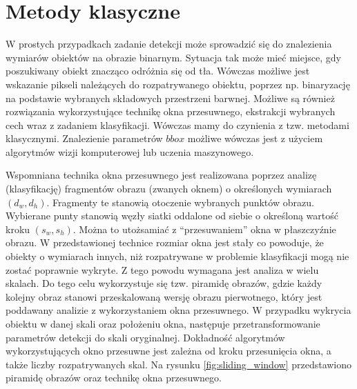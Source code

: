 \section{Metody klasyczne}

W prostych przypadkach zadanie detekcji może sprowadzić się do znalezienia wymiarów obiektów na obrazie binarnym.
Sytuacja tak może mieć miejsce, gdy poszukiwany obiekt znacząco odróżnia się od tła.
Wówczas możliwe jest wskazanie pikseli należących do rozpatrywanego obiektu, poprzez np. binaryzację na podstawie wybranych składowych przestrzeni barwnej.
Możliwe są również rozwiązania wykorzystujące technikę okna przesuwnego, ekstrakcji wybranych cech wraz z zadaniem klasyfikacji.
Wówczas mamy do czynienia z tzw. metodami klasycznymi.
Znalezienie parametrów $bbox$ możliwe wówczas jest z użyciem algorytmów wizji komputerowej lub uczenia maszynowego.

Wspomniana technika okna przesuwnego jest realizowana poprzez analizę (klasyfikację) fragmentów obrazu (zwanych oknem) o określonych wymiarach $(d_w,d_h)$. 
Fragmenty te stanowią otoczenie wybranych punktów obrazu.
Wybierane punty stanowią węzły siatki oddalone od siebie o określoną wartość kroku $(s_w,s_h)$. 
Można to utożsamiać z ``przesuwaniem'' okna w płaszczyźnie obrazu.
W przedstawionej technice rozmiar okna jest stały co powoduje, że obiekty o wymiarach innych, niż 
rozpatrywane w problemie klasyfikacji mogą nie zostać poprawnie wykryte.
Z tego powodu wymagana jest analiza w wielu skalach.
Do tego celu wykorzystuje się tzw. piramidę obrazów, gdzie każdy kolejny obraz stanowi przeskalowaną wersję obrazu pierwotnego, który jest  poddawany analizie z wykorzystaniem okna przesuwnego.
W przypadku wykrycia obiektu w danej skali oraz położeniu okna, następuje przetransformowanie parametrów detekcji do skali oryginalnej.
Dokładność algorytmów wykorzystujących okno przesuwne jest zależna od kroku przesunięcia okna, a także liczby rozpatrywanych skal.
Na rysunku \ref{fig:sliding_window} przedstawiono  piramidę obrazów oraz technikę okna przesuwnego.

